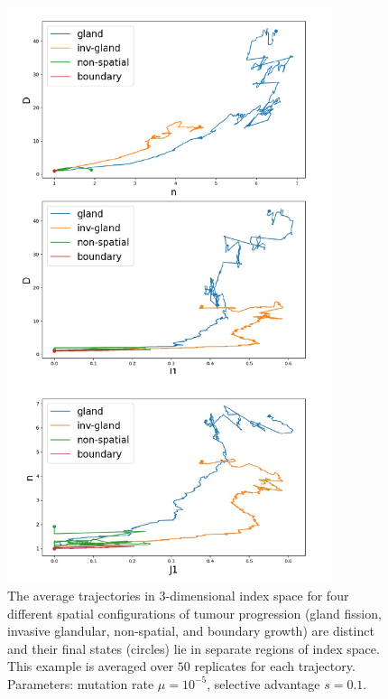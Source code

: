 \begin{figure}[h!]
    \centering
    \includegraphics[width=0.85\textwidth]{Chapter_3/figures/1e0501.pdf}
    \caption{The average trajectories in $3$-dimensional index space for four
    different spatial configurations of tumour progression (gland fission,
    invasive glandular, non-spatial, and boundary growth) are distinct and
    their final states (circles) lie in separate regions of index space. This
    example is averaged over $50$ replicates for each trajectory. Parameters:
    mutation rate $\mu = 10^{-5}$, selective advantage $s = 0.1$.}
    \label{fig:1e05_01}
\end{figure}

